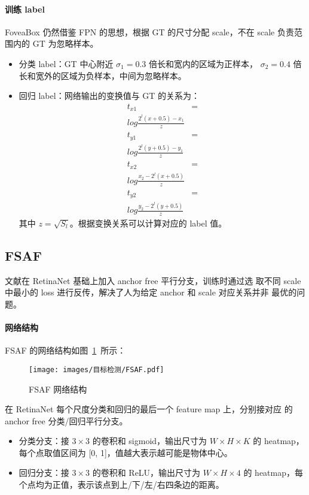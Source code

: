 \paragraph{训练 label}
FoveaBox 仍然借鉴 FPN 的思想，根据 GT 的尺寸分配 scale，不在 scale 负责范围内的
GT 为忽略样本。
\begin{itemize}
  \item 分类 label：GT 中心附近 $\sigma_1=0.3$ 倍长和宽内的区域为正样本，
    $\sigma_2=0.4$ 倍长和宽外的区域为负样本，中间为忽略样本。 
  \item 回归 label：网络输出的变换值与 GT 的关系为：
    \begin{align}
      t_{x1} & = \\log \frac{2^l (x+0.5)-x_1}{z} \\
      t_{y1} & = \\log \frac{2^l (y+0.5)-y_1}{z} \\
      t_{x2} & = \\log \frac{x_2 - 2^l (x+0.5)}{z} \\
      t_{y2} & = \\log \frac{y_2 - 2^l (y+0.5)}{z}
    \end{align}
    其中 $z = \sqrt{S_l}$。根据变换关系可以计算对应的 label 值。
\end{itemize}

\subsection{FSAF}
文献在 RetinaNet 基础上加入 anchor free 平行分支，训练时通过选
取不同 scale 中最小的 loss 进行反传，解决了人为给定 anchor 和 scale 对应关系并非
最优的问题。

\paragraph{网络结构}
FSAF 的网络结构如图~\ref{fig:FSAF}~所示：

\begin{figure}[ht]
  \centering
  \texttt{[image: images/目标检测/FSAF.pdf]}
  \caption{FSAF 网络结构}\label{fig:FSAF}
\end{figure}

在 RetinaNet 每个尺度分类和回归的最后一个 feature map 上，分别接对应
的 anchor free 分类/回归平行分支。

\begin{itemize}
  \item 分类分支：接 $3 \times 3$ 的卷积和 sigmoid，输出尺寸为 $W \times H \times
    K$ 的 heatmap，每个点取值区间为 [0, 1]，值越大表示越可能是物体中心。
  \item 回归分支：接 $3 \times 3$ 的卷积和 ReLU，输出尺寸为 $W \times H \times
    4$ 的 heatmap，每个点均为正值，表示该点到上/下/左/右四条边的距离。
\end{itemize}

